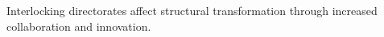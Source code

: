 Interlocking directorates affect structural transformation through increased collaboration and innovation.